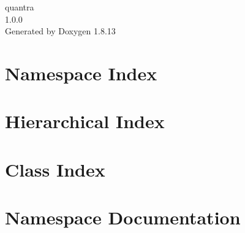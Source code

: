 \documentclass[twoside]{book}
\newcommand{\+}{\discretionary{\mbox{\scriptsize$\hookleftarrow$}}{}{}}
\newcommand{\clearemptydoublepage}{%
  \newpage{\pagestyle{empty}\cleardoublepage}%
}
\begin{document}
\hypersetup{pageanchor=false,
             bookmarksnumbered=true,
             pdfencoding=unicode
            }
\begin{titlepage}
\vspace*{7cm}
\begin{center}%
{\Large quantra \\[1ex]\large 1.\+0.\+0 }\\
\vspace*{1cm}
{\large Generated by Doxygen 1.8.13}\\
\end{center}
\end{titlepage}
\clearemptydoublepage
{}
\tableofcontents
\clearemptydoublepage
{}
\hypersetup{pageanchor=true}

\chapter{Namespace Index}

\chapter{Hierarchical Index}

\chapter{Class Index}

\chapter{Namespace Documentation}


\end{document}

